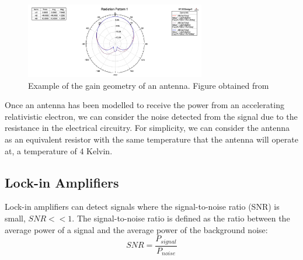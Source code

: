\documentclass[a4paper,12pt, notitlepage]{article}
\begin{document}
\begin{figure}[t!]
\centering
\includegraphics[width=0.7\textwidth]{pictures/gainExample.png}
\vspace{-2mm}
\caption{Example of the gain geometry of an antenna. Figure obtained from \cite{Farahani2008}}
\label{fig:fig05}
\end{figure}
Once an antenna has been modelled to receive the power from an accelerating relativistic electron, we can consider the noise detected from the signal due to the resistance in the electrical circuitry. For simplicity, we can consider the antenna as an equivalent resistor with the same temperature that the antenna will operate at, a temperature of 4 Kelvin.
\subsection{Lock-in Amplifiers} \label{amplifier}
Lock-in amplifiers can detect signals where the signal-to-noise ratio (SNR) is small, $SNR << 1$. The signal-to-noise ratio is defined as the ratio between the average power of a signal and the average power of the background noise:
\begin{equation}
    SNR = \dfrac{P_{signal}}{P_{noise}}
\end{equation}
\end{document}
